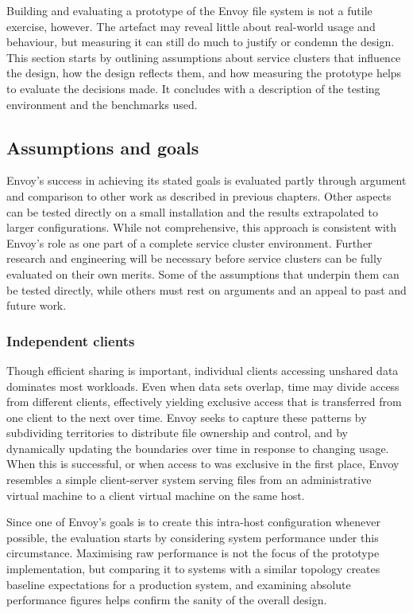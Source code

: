 Building and evaluating a prototype of the Envoy file system is not a futile exercise, however. The artefact may reveal little about real-world usage and behaviour, but measuring it can still do much to justify or condemn the design. This section starts by outlining assumptions about service clusters that influence the design, how the design reflects them, and how measuring the prototype helps to evaluate the decisions made. It concludes with a description of the testing environment and the benchmarks used.

\subsection{Assumptions and goals}

Envoy's success in achieving its stated goals is evaluated partly through argument and comparison to other work as described in previous chapters. Other aspects can be tested directly on a small installation and the results extrapolated to larger configurations. While not comprehensive, this approach is consistent with Envoy's role as one part of a complete service cluster environment. Further research and engineering will be necessary before service clusters can be fully evaluated on their own merits. Some of the assumptions that underpin them can be tested directly, while others must rest on arguments and an appeal to past and future work.

\subsubsection{Independent clients}

Though efficient sharing is important, individual clients accessing unshared data dominates most workloads. Even when data sets overlap, time may divide access from different clients, effectively yielding exclusive access that is transferred from one client to the next over time. Envoy seeks to capture these patterns by subdividing territories to distribute file ownership and control, and by dynamically updating the boundaries over time in response to changing usage. When this is successful, or when access to was exclusive in the first place, Envoy resembles a simple client-server system serving files from an administrative virtual machine to a client virtual machine on the same host.

Since one of Envoy's goals is to create this intra-host configuration whenever possible, the evaluation starts by considering system performance under this circumstance. Maximising raw performance is not the focus of the prototype implementation, but comparing it to systems with a similar topology creates baseline expectations for a production system, and examining absolute performance figures helps confirm the sanity of the overall design.


